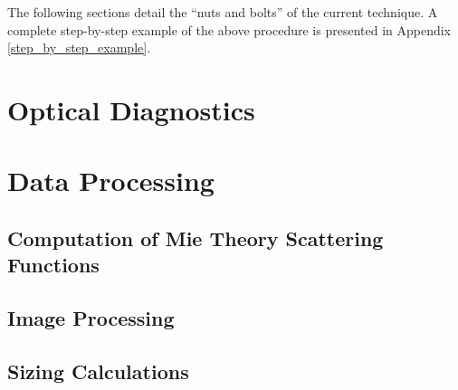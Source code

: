 The following sections detail the ``nuts and bolts'' of the current technique.  A complete step-by-step example of the above procedure is presented in Appendix \ref{step_by_step_example}.

\section{Optical Diagnostics}

%

\section{Data Processing}
\label{data_processing}

  \subsection{Computation of Mie Theory Scattering Functions}
  \label{mie_scattering_matlab_code}


  \subsection{Image Processing}
  \label{image_processing}


  \subsection{Sizing Calculations}
  \label{sizing_calcuations}

